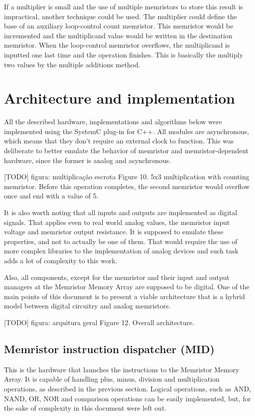 \documentclass[ecp,tc,english]{iiufrgs}
\begin{document}
If a multiplier is small and the use of multiple memristors to store this result is impractical, another technique could be used. The multiplier could define the base of an auxiliary loop-control count memristor. This memristor would be incremented and the multiplicand value would be written in the destination memristor. When the loop-control memristor overflows, the multiplicand is inputted one last time and the operation finishes. This is basically the multiply two values by the multiple additions method.

\chapter{Architecture and implementation}

All the described hardware, implementations and algorithms below were implemented using the SystemC plug-in for C++. All modules are asynchronous, which means that they don't require an external clock to function. This was deliberate to better emulate the behavior of memristor and memristor-dependent hardware, since the former is analog and asynchronous.

[TODO] figura: multiplicação escrota
Figure 10. 5x3 multiplication with counting memristor. Before this operation completes, the second memristor would overflow once and end with a value of 5.

It is also worth noting that all inputs and outputs are implemented as digital signals. That applies even to real world analog values, the memristor input voltage and memristor output resistance. It is supposed to emulate these properties, and not to actually be one of them. That would require the use of more complex libraries to the implementation of analog devices and such task adds a lot of complexity to this work.

Also, all components, except for the memristor and their input and output managers at the Memristor Memory Array are supposed to be digital. One of the main points of this document is to present a viable architecture that is a hybrid model between digital circuitry and analog memristors.

[TODO] figura: arquitura geral
Figure 12. Overall architecture.

\section{Memristor instruction dispatcher (MID)}

This is the hardware that launches the instructions to the Memristor Memory Array. It is capable of handling plus, minus, division and multiplication operations, as described in the previous section. Logical operations, such as AND, NAND, OR, NOR and comparison operations can be easily implemented, but, for the sake of complexity in this document were left out.
\end{document}
